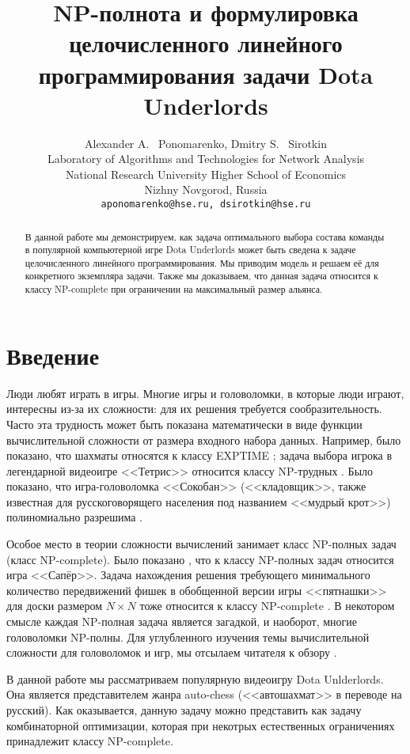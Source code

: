 \documentclass{article}
\title{NP-полнота и формулировка целочисленного линейного программирования задачи Dota Underlords}
\author{
  Alexander A. ~Ponomarenko, Dmitry S. ~Sirotkin \\
  Laboratory of Algorithms and Technologies for Network Analysis\\
  National Research University Higher School of Economics \\
  Nizhny Novgorod, Russia\\
  \texttt{aponomarenko@hse.ru, dsirotkin@hse.ru} \\
}
\begin{document}
\maketitle

\begin{abstract}
В данной работе мы демонстрируем, как задача оптимального выбора состава команды в популярной компьютерной игре Dota Underlords может быть сведена к задаче целочисленного линейного программирования. Мы приводим модель и решаем её для конкретного экземпляра задачи. Также мы доказываем, что данная задача относится к классу NP-complete при ограничении на максимальный размер альянса. 
\end{abstract}




\section{Введение}

Люди любят играть в игры. Многие игры и головоломки, в которые люди играют, интересны из-за их сложности: для их решения требуется сообразительность. Часто эта трудность может быть показана математически в виде функции вычислительной сложности от размера входного набора данных. Например, было показано, что шахматы относятся к классу EXPTIME \cite{fraenkel1981computing}; задача выбора игрока  в легендарной видеоигре <<Тетрис>> относится классу NP-трудных \cite{breukelaar2004tetris}. Было показано, что игра-головоломка <<Сокобан>> (<<кладовщик>>, также известная для русскоговорящего населения под названием <<мудрый крот>>) полиномиально разрешима \cite{hearn2005pspace}.

Особое место в теории сложности вычислений занимает класс NP-полных задач (класс NP-complete). 
Было показано  \cite{kaye2000minesweeper}, что к классу NP-полных задач относится игра <<Сапёр>>. Задача нахождения решения требующего минимального количество передвижений фишек в обобщенной версии игры <<пятнашки>> для доски размером $N \times N$ тоже относится к классу NP-complete \cite{ratner1986finding}. 
В некотором смысле каждая NP-полная задача является загадкой, и наоборот, многие головоломки NP-полны. Для углубленного изучения темы вычислительной сложности для головоломок и игр, мы отсылаем читателя к обзору \cite{costa2018computational}.

В данной работе мы рассматриваем популярную видеоигру Dota Unlderlords. Она является представителем жанра auto-chess (<<автошахмат>> в переводе на русский). Как оказывается, данную задачу можно представить как задачу комбинаторной оптимизации, которая при некотрых естественных ограничениях принадлежит классу NP-complete.
\end{document}
